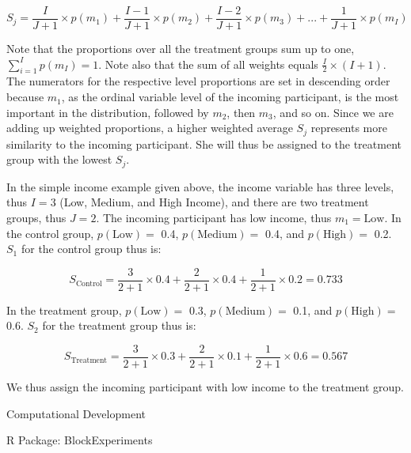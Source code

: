 \documentclass[12pt,]{article}
\makeatletter
\renewcommand\subsubsection{\@startsection{subsubsection}{3}{\z@}
                                     {-3.25ex\@plus -1ex \@minus -.2ex}
                                     {1.5ex \@plus .2ex}
                                     {\normalsize\itshape}} %
\renewcommand\paragraph{\@startsection{paragraph}{4}{\z@}
                                    {-3.25ex \@plus -1ex \@minus -.2ex}
                                    {1.5ex \@plus .2ex}
                                    {\normalsize}} %
\makeatother
\begin{document}
\singlespacing

\vspace{-0.4cm}

\[S_j = \frac{I}{J+1} \times p(m_1) + \frac{I-1}{J+1} \times p(m_2) + \frac{I-2}{J+1} \times p(m_3) + ... + \frac{1}{J+1} \times p(m_I)\]

\vspace{0.1cm}

\doublespacing

Note that the proportions over all the treatment groups sum up to one,
\(\sum\limits_{i=1}^I p(m_I) = 1\). Note also that the sum of all
weights equals \(\frac{I}{2} \times (I+1)\). The numerators for the
respective level proportions are set in descending order because
\(m_1\), as the ordinal variable level of the incoming participant, is
the most important in the distribution, followed by \(m_2\), then
\(m_3\), and so on. Since we are adding up weighted proportions, a
higher weighted average \(S_j\) represents more similarity to the
incoming participant. She will thus be assigned to the treatment group
with the lowest \(S_j\).

In the simple income example given above, the income variable has three
levels, thus \(I=3\) (Low, Medium, and High Income), and there are two
treatment groups, thus \(J = 2\). The incoming participant has low
income, thus \(m_1 = \text{Low}\). In the control group,
\(p(\text{Low}) =\) 0.4, \(p(\text{Medium}) =\) 0.4, and
\(p(\text{High}) =\) 0.2. \(S_1\) for the control group thus is:

\[S_{\text{Control}} = \frac{3}{2+1} \times 0.4+ \frac{2}{2+1} \times 0.4 + \frac{1}{2+1} \times 0.2 = 0.733\]

In the treatment group, \(p(\text{Low}) =\) 0.3, \(p(\text{Medium}) =\)
0.1, and \(p(\text{High}) =\) 0.6. \(S_2\) for the treatment group thus
is:

\[S_{\text{Treatment}} = \frac{3}{2+1} \times 0.3 + \frac{2}{2+1} \times 0.1 + \frac{1}{2+1} \times 0.6 = 0.567\]

We thus assign the incoming participant with low income to the treatment
group.

\subsubsection{Computational Development}\label{seq-computational}

\paragraph{R Package: BlockExperiments}\label{seq-computational-r}
\end{document}

